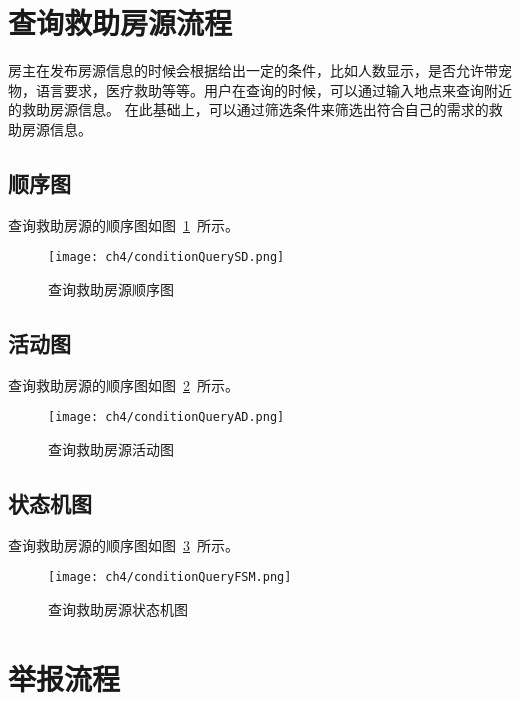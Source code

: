 
\section{查询救助房源流程}
房主在发布房源信息的时候会根据给出一定的条件，比如人数显示，是否允许带宠物，语言要求，医疗救助等等。用户在查询的时候，可以通过输入地点来查询附近的救助房源信息。
在此基础上，可以通过筛选条件来筛选出符合自己的需求的救助房源信息。
\subsection{顺序图}
查询救助房源的顺序图如图~\ref{fig:conditionQuerySD}~所示。
\begin{figure}[htbp]
    \centering
    \texttt{[image: ch4/conditionQuerySD.png]}
    \caption{查询救助房源顺序图}\label{fig:conditionQuerySD}
    \vspace{\baselineskip} %
\end{figure}
\newpage
\subsection{活动图}
查询救助房源的顺序图如图~\ref{fig:conditionQueryAD}~所示。
\begin{figure}[htbp]
    \centering
    \texttt{[image: ch4/conditionQueryAD.png]}
    \caption{查询救助房源活动图}\label{fig:conditionQueryAD}
    \vspace{\baselineskip} %
\end{figure}
\newpage
\subsection{状态机图}
查询救助房源的顺序图如图~\ref{fig:conditionQueryFSM}~所示。
\begin{figure}[htbp]
    \centering
    \texttt{[image: ch4/conditionQueryFSM.png]}
    \caption{查询救助房源状态机图}\label{fig:conditionQueryFSM}
    \vspace{\baselineskip} %
\end{figure}


\section{举报流程}
